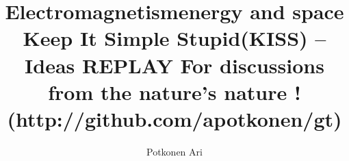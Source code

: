 \documentclass[a5paper,final]{memoir}
\begin{document}
\title{\Huge\textbf{Electromagnetism\linebreak energy and space}
\linebreak Keep It Simple Stupid\linebreak (KISS) -- Ideas \linebreak
\linebreak REPLAY \linebreak
\linebreak \linebreak
\linebreak
\small
For discussions from the nature's nature !\linebreak
(http://github.com/apotkonen/gt)
}
\author{\Large Potkonen Ari}
\SetDate[25/12/2023]
\maketitle
\pagebreak
\pagestyle{plain}
\parindent 0pt
\setcounter{page}{1}
\pagebreak %
\tableofcontents
\listoffigures
\vspace*{\fill}
\pagebreak %
\pagestyle{headings}
\setcounter{page}{1}
\parindent 0pt
\end{document}
